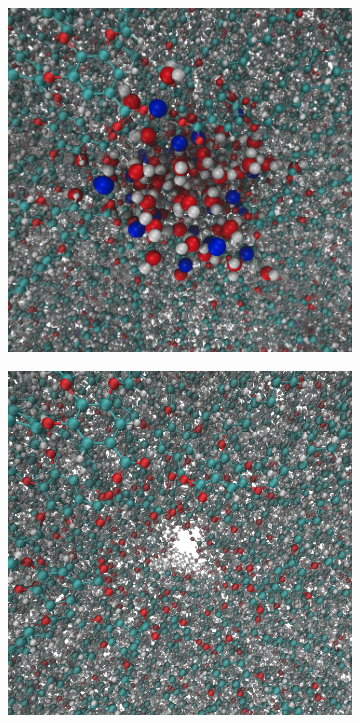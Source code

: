 \documentclass{article}
\begin{document}
  \begin{figure}
  \centering
        \begin{subfigure}{0.45\textwidth}
                \includegraphics[width=\textwidth]{water_filled_pore.png}
                \caption{}\label{fig:water_filled_pores}
        \end{subfigure}
        \begin{subfigure}{0.45\textwidth}
                \includegraphics[width=\textwidth]{water_removed.png}

\end{subfigure}
\end{figure}
\end{document}
